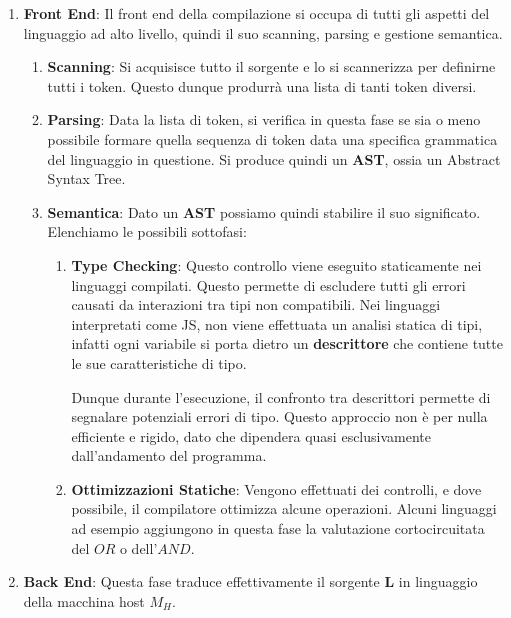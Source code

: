 \documentclass{article}
\begin{document}
\begin{enumerate}
    \item \textbf{Front End}: Il front end della compilazione si occupa di tutti gli aspetti del linguaggio ad alto livello, quindi il suo scanning, parsing e gestione semantica.
    \begin{enumerate}
        \item \textbf{Scanning}: Si acquisisce tutto il sorgente e lo si scannerizza per definirne tutti i token. Questo dunque produrrà una lista di tanti token diversi.
        \item \textbf{Parsing}: Data la lista di token, si verifica in questa fase se sia o meno possibile formare quella sequenza di token data una specifica grammatica del linguaggio in questione. Si produce quindi un \textbf{AST}, ossia un Abstract Syntax Tree.
        \item \textbf{Semantica}: Dato un \textbf{AST} possiamo quindi stabilire il suo significato. Elenchiamo le possibili sottofasi:
        \begin{enumerate}
            \item \textbf{Type Checking}: Questo controllo viene eseguito staticamente nei linguaggi compilati. Questo permette di escludere tutti gli errori causati da interazioni tra tipi non compatibili. Nei linguaggi interpretati come JS, non viene effettuata un analisi statica di tipi, infatti ogni variabile si porta dietro un \textbf{descrittore} che contiene tutte le sue caratteristiche di tipo.

            \newpage
            
            Dunque durante l'esecuzione, il confronto tra descrittori permette di segnalare potenziali errori di tipo. Questo approccio non è per nulla efficiente e rigido, dato che dipendera quasi esclusivamente dall'andamento del programma.

            \item \textbf{Ottimizzazioni Statiche}: Vengono effettuati dei controlli, e dove possibile, il compilatore ottimizza alcune operazioni. Alcuni linguaggi ad esempio aggiungono in questa fase la valutazione cortocircuitata del $OR$ o dell'$AND$.
            
        \end{enumerate}
    \end{enumerate}
    \item \textbf{Back End}: Questa fase traduce effettivamente il sorgente \textbf{L} in linguaggio della macchina host \textbf{$M_{H}$}.
\end{enumerate}
\end{document}
